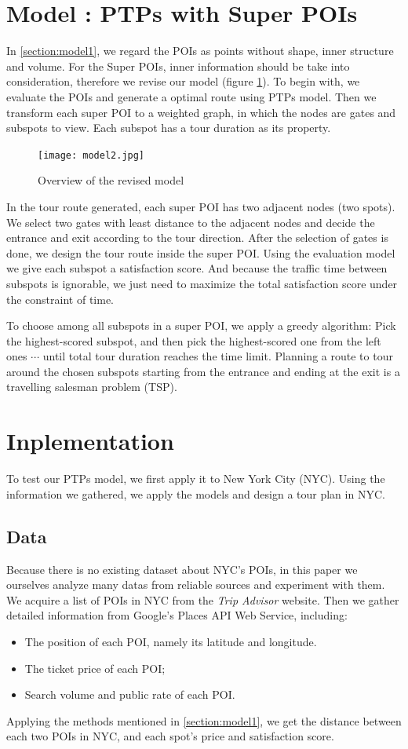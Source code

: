 \documentclass{mcmthesis}
\newcommand{\RNum}[1]{\uppercase\expandafter{\romannumeral #1\relax}}
\begin{document}
\section{Model \RNum{2}: PTPs with Super POIs} \label{section:model2}
  In \ref{section:model1}, we regard the POIs as points without shape, inner structure and volume. For the Super POIs, inner information should be take into consideration, therefore we revise our model (figure \ref{fig:model2}). To begin with, we evaluate the POIs and generate a optimal route using PTPs model. Then we transform each super POI to a weighted graph, in which the nodes are gates and subspots to view. Each subspot has a tour duration as its property. \par
  \begin{figure}[ht]
    \centering
    \texttt{[image: model2.jpg]}
    \caption{Overview of the revised model}
    \label{fig:model2}
  \end{figure}
  In the tour route generated, each super POI has two adjacent nodes (two spots). We select two gates with least distance to the adjacent nodes and decide the entrance and exit according to the tour direction. After the selection of gates is done, we design the tour route inside the super POI. Using the evaluation model we give each subspot a satisfaction score. And because the traffic time between subspots is ignorable, we just need to maximize the total satisfaction score under the constraint of time. \par
  To choose among all subspots in a super POI, we apply a greedy algorithm: Pick the highest-scored subspot, and then pick the highest-scored one from the left ones $\cdots$ until total tour duration reaches the time limit. Planning a route to tour around the chosen subspots starting from the entrance and ending at the exit is a travelling salesman problem (TSP).




\section{Inplementation}
  To test our PTPs model, we first apply it to New York City (NYC). Using the information we gathered, we apply the models and design a tour plan in NYC.
\subsection{Data}
  Because there is no existing dataset about NYC's POIs, in this paper we ourselves analyze many datas from reliable sources and experiment with them. We acquire a list of POIs in NYC from the \emph{Trip Advisor} website\cite{TripAdv}. Then we gather detailed information from Google's Places API Web Service\cite{GMaps}, including:
  \begin{itemize}
    \item The position of each POI, namely its latitude and longitude.
    \item The ticket price of each POI;
    \item Search volume and public rate of each POI.
  \end{itemize}
  Applying the methods mentioned in \ref{section:model1}, we get the distance between each two POIs in NYC, and each spot's price and satisfaction score. 
\end{document}
